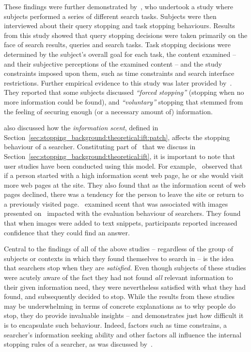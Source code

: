 These findings were further demonstrated by~\cite{wu2014information_scent}, who undertook a study where subjects performed a series of different search tasks. Subjects were then interviewed about their query stopping and task stopping behaviours. Results from this study showed that query stopping decisions were taken primarily on the face of search results, queries and search tasks. Task stopping decisions were determined by the subject's overall goal for each task, the content examined -- and their subjective perceptions of the examined content -- and the study constraints imposed upon them, such as time constraints and search interface restrictions. Further empirical evidence to this study was later provided by~\cite{wu2014stopping_query_abandonment}. They reported that some subjects discussed \emph{``forced stopping''} (stopping when no more information could be found), and \emph{``voluntary''} stopping that stemmed from the feeling of securing enough (or a necessary amount of) information.

\cite{wu2014information_scent} also discussed how the \emph{information scent}, defined in Section~\ref{sec:stopping_background:theoretical:ift:patch}, affects the stopping behaviour of a searcher. Constituting part of~ that we discuss in Section~\ref{sec:stopping_background:theoretical:ift}, it is important to note that user studies have been conducted using this model. For example,~\cite{card2001scent_graphs} observed that if a person started with a high information scent web page, he or she would visit more web pages at the site. They also found that as the information scent of web pages declined, there was a tendency for the person to leave the site or return to a previously visited page.~\cite{loumakis2011image_smells} examined scent that was associated with images presented on~ impacted with the evaluation behaviour of searchers. They found that when images were added to text snippets, participants reported increased confidence that they could find an answer.

Central to the findings of all of the above studies -- regardless of the group of subjects or contexts in which they found themselves to search in -- is the idea that searchers stop when they are \emph{satisfied.} Even though subjects of these studies were acutely aware of the fact they had not found \emph{all} relevant information to their given information need, they were nevertheless satisfied with what they had found, and subsequently decided to stop. While the results from these studies may be underwhelming in terms of concrete explanations as to why people do stop, they do provide invaluable insights -- and demonstrates just how difficult it is to encapsulate such behaviour. Indeed, factors such as time constrains, a searcher's information seeking ability and other factors all influence the internal stopping rules of a searcher, as was discussed by~\cite{marchionini1995information_seeking}. 

